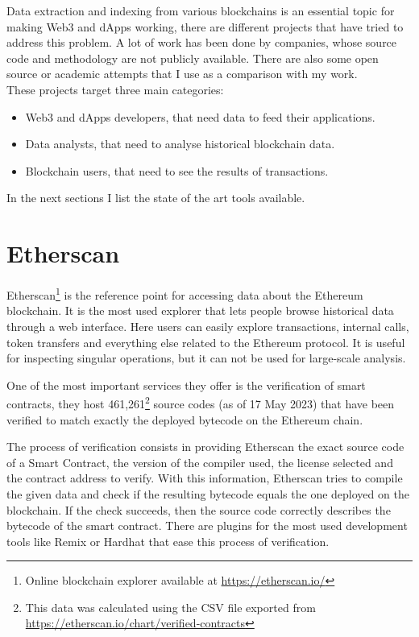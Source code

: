 \label{chapter-3}
Data extraction and indexing from various blockchains is an essential topic for making Web3 and dApps working, there are different projects that have tried to address this problem. A lot of work has been done by companies, whose source code and methodology are not publicly available. There are also some open source or academic attempts that I use as a comparison with my work. \\

\noindent These projects target three main categories:

\begin{itemize}
  \item Web3 and dApps developers, that need data to feed their applications.
  \item Data analysts, that need to analyse historical blockchain data. 
  \item Blockchain users, that need to see the results of transactions.
\end{itemize}

\noindent In the next sections I list the state of the art tools available.

\section{Etherscan}

Etherscan\footnote{Online blockchain explorer available at \url{https://etherscan.io/}} is the reference point for accessing data about the Ethereum blockchain. It is the most used explorer that lets people browse historical data through a web interface. Here users can easily explore transactions, internal calls, token transfers and everything else related to the Ethereum protocol. It is useful for inspecting singular operations, but it can not be used for large-scale analysis.

One of the most important services they offer is the verification of smart contracts, they host 461,261\footnote{This data was calculated using the CSV file exported from \url{https://etherscan.io/chart/verified-contracts}} source codes (as of 17 May 2023) that have been verified to match exactly the deployed bytecode on the Ethereum chain. 

The process of verification consists in providing Etherscan the exact source code of a Smart Contract, the version of the compiler used, the license selected and the contract address to verify. With this information, Etherscan tries to compile the given data and check if the resulting bytecode equals the one deployed on the blockchain. If the check succeeds, then the source code correctly describes the bytecode of the smart contract. There are plugins for the most used development tools like Remix or Hardhat that ease this process of verification.

